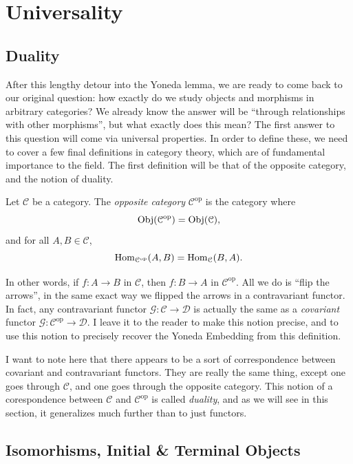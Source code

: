 \section{Universality}

\subsection{Duality}

After this lengthy detour into the Yoneda lemma, we are ready to come back to our original question: how exactly do we study objects and morphisms in arbitrary categories? We already know the answer will be ``through relationships with other morphisms'', but what exactly does this mean? The first answer to this question will come via universal properties. In order to define these, we need to cover a few final definitions in category theory, which are of fundamental importance to the field. The first definition will be that of the opposite category, and the notion of duality.

\begin{definition}\label{dfn:1}
	Let $\mathcal{C} $ be a category. The \emph{opposite category} $\mathcal{C} ^{\mathrm{op} } $ is the category where
	\[
		\operatorname{Obj}(\mathcal{C}^{\mathrm{op} }) =\operatorname{Obj}(\mathcal{C} ) ,
	\]
	and for all $A,B\in \mathcal{C} $,
	\[
		\operatorname{Hom}_{\mathcal{C} ^{\mathrm{op} } }(A, B) =\operatorname{Hom}_{\mathcal{C} }(B, A) 
	.\]
\end{definition}
In other words, if $f : A \to B$ in $\mathcal{C} $, then $f : B \to A$ in $\mathcal{C} ^{\mathrm{op} } $. All we do is ``flip the arrows'', in the same exact way we flipped the arrows in a contravariant functor. In fact, any contravariant functor $\mathcal{G} : \mathcal{C}  \to \mathcal{D} $ is actually the same as a \emph{covariant} functor $\mathcal{G} : \mathcal{C} ^{\mathrm{op} }  \to \mathcal{D} $. I leave it to the reader to make this notion precise, and to use this notion to precisely recover the Yoneda Embedding from this definition.

I want to note here that there appears to be a sort of correspondence between covariant and contravariant functors. They are really the same thing, except one goes through $\mathcal{C} $, and one goes through the opposite category. This notion of a corespondence between $\mathcal{C} $ and $\mathcal{C} ^{\mathrm{op} } $ is called \emph{duality}, and as we will see in this section, it generalizes much further than to just functors.

\subsection{Isomorhisms, Initial \& Terminal Objects}

